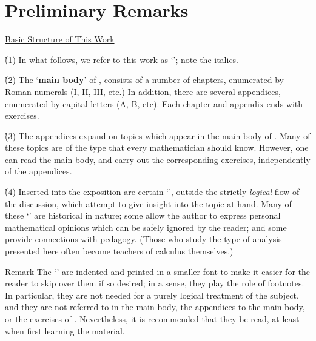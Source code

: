 \V
\V

        
                \section{Preliminary Remarks} 
                        \label{SectA05}

\V
\V

       \h \underline{Basic Structure of This Work}

\V

        \h \h (1) In what follows, we refer to this work as `{\bf {\ThisText}}'\IndA{\ThisText}; note the italics.

\V

        \h \h (2) The `{\bf main body}' of {\ThisText}, consists of a number of chapters,
    enumerated by Roman numerals (I, II, III, etc.) In addition, there are several appendices, enumerated by capital letters (A, B, etc).
    Each chapter and appendix ends with exercises. %

\V

        \h \h (3) The appendices expand on topics which appear in the main body of {\ThisText}. Many of these topics are of the type that every mathematician should know.
    However, one can read the main body, and carry out the corresponding exercises, independently of the appendices.

\V

        \h \h (4) Inserted into the exposition are certain `\Notes', outside the strictly {\em logical} flow of the discussion,
    which attempt to give insight into the topic at hand. Many of these `\Notes' are historical in nature; some allow the author to express personal mathematical opinions which can be safely ignored by the reader; and some provide connections with pedagogy.
    (Those who study the type of analysis presented here often become teachers of calculus themselves.)


    \underline{Remark} The `\Notes' are indented and printed in a smaller font to make it easier for the reader to skip over them if so desired;
    in a sense, they play the role of footnotes. In particular, they are not needed for a purely logical treatment of the subject,
    and they are not referred to in the main body, the appendices to the main body, or the exercises of {\ThisText}.
    Nevertheless, it is recommended that they be read, at least when first learning the material.


